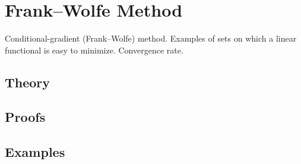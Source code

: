 
\section{Frank–Wolfe Method}
\label{sec:2.4.14-frank-wolfe}

\begin{ticket}
Conditional-gradient (Frank–Wolfe) method. Examples of sets on which a linear functional is easy to minimize. Convergence rate.
\end{ticket}

\subsection*{Theory}

\subsection*{Proofs}

\subsection*{Examples}
